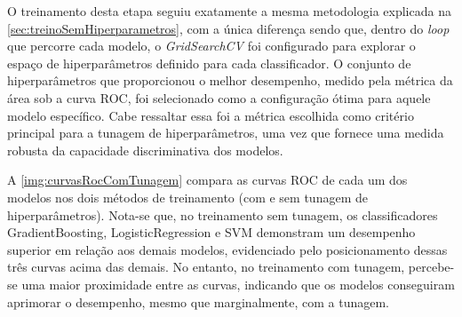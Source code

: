 O treinamento desta etapa seguiu exatamente a mesma metodologia explicada na \autoref{sec:treinoSemHiperparametros}, com a única diferença sendo que, dentro do \textit{loop} que percorre cada modelo, o \textit{GridSearchCV} foi configurado para explorar o espaço de hiperparâmetros definido para cada classificador. O conjunto de hiperparâmetros que proporcionou o melhor desempenho, medido pela métrica da área sob a curva ROC, foi selecionado como a configuração ótima para aquele modelo específico. Cabe ressaltar essa foi a métrica escolhida como critério principal para a tunagem de hiperparâmetros, uma vez que fornece uma medida robusta da capacidade discriminativa dos modelos.

A \autoref{img:curvasRocComTunagem} compara as curvas ROC de cada um dos modelos nos dois métodos de treinamento (com e sem tunagem de hiperparâmetros). Nota-se que, no treinamento sem tunagem, os classificadores GradientBoosting, LogisticRegression e SVM demonstram um desempenho superior em relação aos demais modelos, evidenciado pelo posicionamento dessas três curvas acima das demais. No entanto, no treinamento com tunagem, percebe-se uma maior proximidade entre as curvas, indicando que os modelos conseguiram aprimorar o desempenho, mesmo que marginalmente, com a tunagem.

